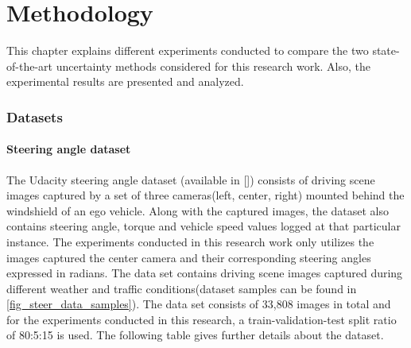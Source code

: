 

\chapter{Methodology}
This chapter explains different experiments conducted to compare the two state-of-the-art uncertainty methods considered for this research work. Also, the experimental results are presented and analyzed.
\subsection{Datasets}
\subsubsection{Steering angle dataset}
The Udacity steering angle dataset (available in []) consists of driving scene images captured by a set of three cameras(left, center, right) mounted behind the windshield of an ego vehicle. Along with the captured images, the dataset also contains steering angle, torque and vehicle speed values logged at that particular instance. The experiments conducted in this research work only utilizes the images captured the center camera and their corresponding steering angles expressed in radians. The data set contains driving scene images captured during different weather and traffic conditions(dataset samples can be found in \ref{fig_steer_data_samples}). The data set consists of 33,808 images in total and for the experiments conducted in this research, a train-validation-test split ratio of 80:5:15 is used. The following table gives further details about the dataset.


